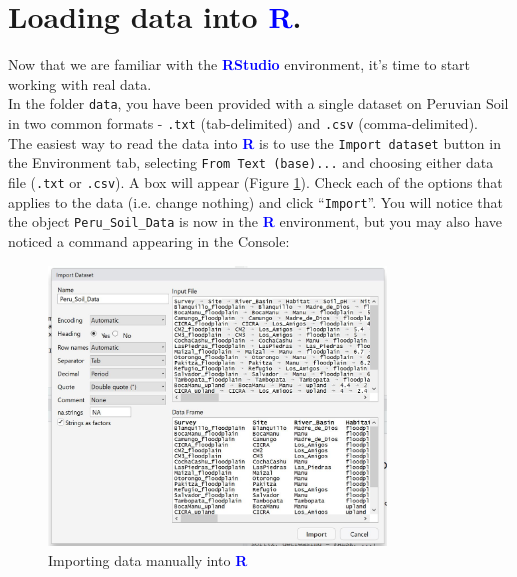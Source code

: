 \documentclass[a4paper,12pt]{article}
\newcommand\boldblue[1]{\textcolor{blue}{\textbf{#1}}}
\begin{document}
\section{Loading data into \boldblue{R}.}

Now that we are familiar with the \boldblue{RStudio} environment, it's time to start working with real data. \\

In the folder \texttt{data}, you have been provided with a single dataset on Peruvian Soil in two common formats - \texttt{.txt} (tab-delimited) and \texttt{.csv} (comma-delimited). \\

The easiest way to read the data into \boldblue{R} is to use the \texttt{Import dataset} button in the Environment tab, selecting \texttt{From Text (base)...} and choosing either data file (\texttt{.txt} or \texttt{.csv}). A box will appear (Figure \ref{fig:Import_Dataset2}). Check each of the options that applies to the data (i.e. change nothing) and click ``\texttt{Import}''. You will notice that the object \texttt{Peru\_Soil\_Data} is now in the \boldblue{R} environment, but you may also have noticed a command appearing in the Console: \\


\begin{figure}[t]
	\centering 
	\includegraphics[width=0.8\textwidth]{figs/Import_Dataset2.JPG}
	\caption{Importing data manually into \boldblue{R}}
	\label{fig:Import_Dataset2}
\end{figure} 
\end{document}
